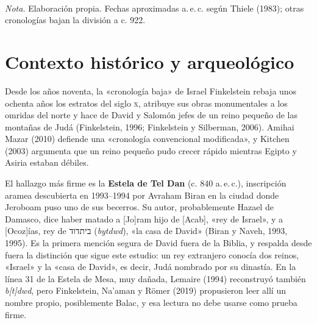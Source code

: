 \documentclass[11pt,letterpaper]{article}
\newcommand{\heb}[1]{\mbox{\foreignlanguage{hebrew}{#1}}}
\begin{document}
\begin{center}
\\[2pt]
{\footnotesize\color{sepia}\textit{Nota.} Elaboración propia. Fechas aproximadas a.\,e.\,c. según Thiele (1983); otras cronologías bajan la división a c. 922.}
\end{center}

\section{Contexto histórico y arqueológico}

Desde los años noventa, la «cronología baja» de Israel Finkelstein rebaja unos ochenta años los estratos del siglo \textsc{x}, atribuye sus obras monumentales a los omridas del norte y hace de David y Salomón jefes de un reino pequeño de las montañas de Judá (Finkelstein, 1996; Finkelstein y Silberman, 2006). Amihai Mazar (2010) defiende una «cronología convencional modificada», y Kitchen (2003) argumenta que un reino pequeño pudo crecer rápido mientras Egipto y Asiria estaban débiles.

El hallazgo más firme es la \textbf{Estela de Tel Dan} (c. 840 a.\,e.\,c.), inscripción aramea descubierta en 1993--1994 por Avraham Biran en la ciudad donde Jeroboam puso uno de sus becerros. Su autor, probablemente Hazael de Damasco, dice haber matado a [Jo]ram hijo de [Acab], «rey de Israel», y a [Ocoz]ías, rey de \heb{ביתדוד} (\emph{bytdwd}), «la casa de David» (Biran y Naveh, 1993, 1995). Es la primera mención segura de David fuera de la Biblia, y respalda desde fuera la distinción que sigue este estudio: un rey extranjero conocía dos reinos, «Israel» y la «casa de David», es decir, Judá nombrado por su dinastía. En la línea 31 de la Estela de Mesa, muy dañada, Lemaire (1994) reconstruyó también \emph{b[t]dwd}, pero Finkelstein, Na'aman y Römer (2019) propusieron leer allí un nombre propio, posiblemente Balac, y esa lectura no debe usarse como prueba firme.
\end{document}
